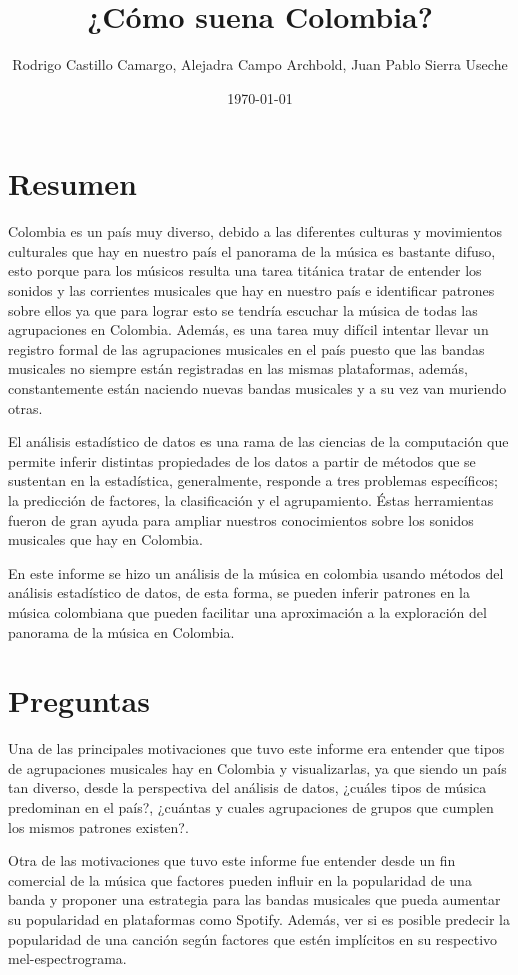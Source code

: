\documentclass[11pt]{article}
\author{Rodrigo Castillo Camargo, Alejadra Campo Archbold, Juan Pablo Sierra Useche}
\date{\today}
\title{¿Cómo suena Colombia?}
\begin{document}
\maketitle

\section{Resumen}
\label{sec:org20438c8}
Colombia es un país muy diverso, debido a las diferentes culturas y movimientos
culturales que hay en nuestro país el panorama de la música es bastante difuso,
esto porque para los músicos resulta una tarea titánica tratar de entender los
sonidos y las corrientes musicales que hay en nuestro país e identificar
patrones sobre ellos ya que para lograr esto se tendría escuchar la música de
todas las agrupaciones en Colombia. Además, es una tarea muy difícil intentar
llevar un registro formal de las agrupaciones musicales en el país puesto que
las bandas musicales no siempre están registradas en las mismas plataformas,
además, constantemente están naciendo nuevas bandas musicales y a su vez van
muriendo otras.

El análisis estadístico de datos es una rama de las ciencias de la computación
que permite inferir distintas propiedades de los datos a partir de métodos que
se sustentan en la estadística, generalmente, responde a tres problemas
específicos; la predicción  de factores, la clasificación y el agrupamiento.
Éstas herramientas fueron de gran ayuda para ampliar nuestros conocimientos
sobre los sonidos musicales que hay en Colombia.

En este informe se hizo un análisis de la música en colombia usando métodos del
análisis estadístico de datos, de esta forma, se pueden inferir patrones en la
música colombiana que pueden facilitar una aproximación a la exploración del
panorama de la música en Colombia.

\section{Preguntas}
\label{sec:org01ce5fe}
Una de las principales motivaciones que tuvo este informe era entender que tipos
de agrupaciones musicales hay en Colombia y visualizarlas, ya que siendo un país
tan diverso, desde la perspectiva del análisis de datos, ¿cuáles tipos de
música predominan en el país?, ¿cuántas y cuales agrupaciones de grupos que
cumplen los mismos patrones existen?.

Otra de las motivaciones que tuvo este informe fue entender desde un fin
comercial de la música que factores pueden influir en la popularidad de una
banda y proponer una estrategia para las bandas musicales que pueda aumentar su
popularidad en plataformas como Spotify. Además, ver si es posible predecir la
popularidad de una canción según factores que estén implícitos en su respectivo
mel-espectrograma.
\end{document}
